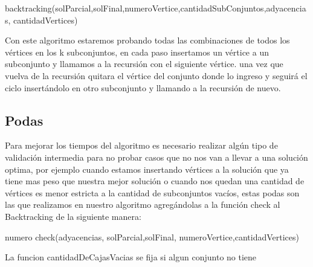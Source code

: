 \begin{algorithm}
  \begin{algorithmic}[1]\parskip=1mm
 \caption{backtracking(solParcial,solFinal,numeroVertice,cantidadSubConjuntos,adyacencias, cantidadVertices)}

  \end{algorithmic}
  \end{algorithm}

Con este algoritmo estaremos probando todas las combinaciones de todos los vértices en los k subconjuntos, en cada paso insertamos un vértice a un subconjunto y llamamos a la recursión con el siguiente vértice. una vez que vuelva de la recursión quitara el vértice del conjunto donde lo ingreso y seguirá el ciclo insertándolo en otro subconjunto y llamando a la recursión de nuevo.

\subsection{Podas}
Para mejorar los tiempos del algoritmo es necesario realizar algún tipo de validación intermedia para no probar casos que no nos van a llevar a una solución optima, por ejemplo cuando estamos insertando vértices a la solución que ya tiene mas peso que nuestra mejor solución o cuando nos quedan una cantidad de vértices es menor estricta a la cantidad de subconjuntos vacíos, estas podas son las que realizamos en nuestro algoritmo agregándolas a la función check al Backtracking de la siguiente manera:

\begin{algorithm}
  \begin{algorithmic}[1]\parskip=1mm
 \caption{numero check(adyacencias, solParcial,solFinal, numeroVertice,cantidadVertices)}
  \end{algorithmic}
  \end{algorithm}
La funcion cantidadDeCajasVacias se fija si algun conjunto no tiene  
 
